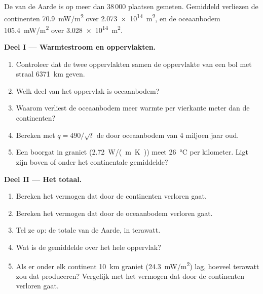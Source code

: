 \begin{problem}
\label{pb:g12:internal-heat:1}
De  van de Aarde is op meer dan 38\,000 plaatsen gemeten.
Gemiddeld verliezen de continenten \qty{70.9}{mW/m^2} over \qty{2.073e14}{m^2},
en de oceaanbodem \qty{105.4}{mW/m^2} over \qty{3.028e14}{m^2}.

\medskip
\noindent\textbf{Deel I --- Warmtestroom en oppervlakten.}
\begin{enumerate}
  \item Controleer dat de twee oppervlakten samen de oppervlakte van een bol met straal
        \qty{6371}{km} geven.
  \item Welk deel van het oppervlak is oceaanbodem?
  \item Waarom verliest de oceaanbodem meer warmte per vierkante meter dan de
        continenten?
  \item Bereken met $q = 490/\sqrt{t}$ de  door oceaanbodem van
        4 miljoen jaar oud.
  \item Een boorgat in graniet (\qty{2.72}{W/(m.K)}) meet
        \qty{26}{\celsius} per kilometer. Ligt zijn  boven of onder het
        continentale gemiddelde?
\end{enumerate}

\medskip
\noindent\textbf{Deel II --- Het totaal.}
\begin{enumerate}[resume]
  \item Bereken het vermogen dat door de continenten verloren gaat.
  \item Bereken het vermogen dat door de oceaanbodem verloren gaat.
  \item Tel ze op: de totale  van de Aarde, in terawatt.
  \item Wat is de gemiddelde  over het hele oppervlak?
  \item Als er onder elk continent \qty{10}{km} graniet (\qty{24.3}{mW/m^2}) lag,
        hoeveel terawatt zou dat produceren? Vergelijk met het
        vermogen dat door de continenten verloren gaat.
\end{enumerate}


\end{problem}
